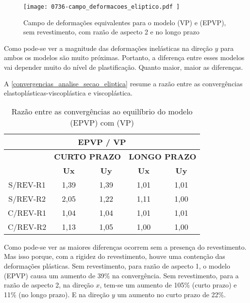 \begin{figure}[H]
	\begin{center}
		\texttt{[image: 0736-campo\_deformacoes\_eliptico.pdf
		]}
	\end{center}
	\caption{\label{campo_deformacoes_eliptico}Campo de deformações equivalentes para o modelo (VP) e (EPVP), sem revestimento, com razão de aspecto 2 e no longo prazo}
\end{figure}

Como pode-se ver a magnitude das deformações inelásticas na direção $y$ para ambos os modelos são muito próximas. Portanto, a diferença entre esses modelos vai depender muito do nível de plastificação. Quanto maior, maior as diferenças.

A \autoref{convergencias_analise_secao_eliptica} resume a razão entre as convergências elastoplásticas-viscoplástica e viscoplástica.

\begin{table}[H]
	\caption{Razão entre as convergências ao equilíbrio do modelo (EPVP) com (VP)}
	\label{convergencias_analise_secao_eliptica}
	\centering
	\small
	\renewcommand{\arraystretch}{1.25}
	\begin{tabular}{c c c c c}
		\hline
		\multicolumn{5}{c}{\textbf{EPVP / VP}}\\	
		\hline
		\multicolumn{1}{c}{} &
		\multicolumn{2}{c}{\textbf{CURTO PRAZO}} &
		\multicolumn{2}{c}{\textbf{LONGO PRAZO}}	\\
		\multicolumn{1}{c}{} &
		\multicolumn{1}{c}{\textbf{Ux}} &
		\multicolumn{1}{c}{\textbf{Uy}} &
		\multicolumn{1}{c}{\textbf{Ux}} &
		\multicolumn{1}{c}{\textbf{Uy}} \\
		\hline
		S/REV-R1	 &	1,39 &	1,39 &	1,01 &	1,01 \\
		S/REV-R2	 &	2,05 &	1,22 &	1,11 &	1,00 \\
		C/REV-R1	 &	1,04 &	1,04 &	1,01 &	1,01 \\
		C/REV-R2	 &	1,13 &	1,05 &	1,00 &	1,00 \\
		\hline
	\end{tabular}
	\normalsize
\end{table}

Como pode-se ver as maiores diferenças ocorrem sem a presença do revestimento. Mas isso porque, com a rigidez do revestimento, houve uma contenção das deformações plásticas. Sem revestimento, para razão de aspecto 1, o modelo (EPVP) causa um aumento de 39\% na convergência. Sem revestimento, para a razão de aspecto 2, na direção $x$, tem-se um aumento de 105\% (curto prazo) e 11\% (no longo prazo). E na direção $y$ um aumento no curto prazo de 22\%.

